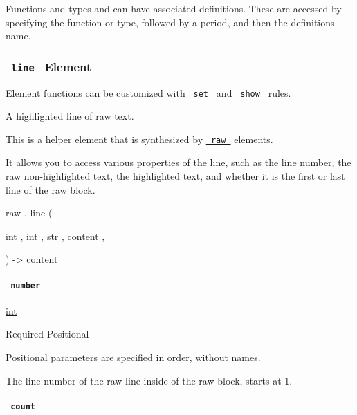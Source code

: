 \label{definitions-tooltip}
Functions and types and can have associated definitions. These are
accessed by specifying the function or type, followed by a period, and
then the definition\textquotesingle s name.

\subsubsection{\texorpdfstring{\texttt{\ line\ } {{ Element
}}}{ line   Element }}\label{definitions-line}

\label{definitions-line-element-tooltip}
Element functions can be customized with \texttt{\ set\ } and
\texttt{\ show\ } rules.

A highlighted line of raw text.

This is a helper element that is synthesized by
\href{/docs/reference/text/raw/}{\texttt{\ raw\ }} elements.

It allows you to access various properties of the line, such as the line
number, the raw non-highlighted text, the highlighted text, and whether
it is the first or last line of the raw block.

raw { . } { line } (

{ \href{/docs/reference/foundations/int/}{int} , } {
\href{/docs/reference/foundations/int/}{int} , } {
\href{/docs/reference/foundations/str/}{str} , } {
\href{/docs/reference/foundations/content/}{content} , }

) -\textgreater{} \href{/docs/reference/foundations/content/}{content}

\paragraph{\texorpdfstring{\texttt{\ number\ }}{ number }}\label{definitions-line-number}

\href{/docs/reference/foundations/int/}{int}

{Required} {{ Positional }}

\label{definitions-line-number-positional-tooltip}
Positional parameters are specified in order, without names.

The line number of the raw line inside of the raw block, starts at 1.

\paragraph{\texorpdfstring{\texttt{\ count\ }}{ count }}\label{definitions-line-count}

